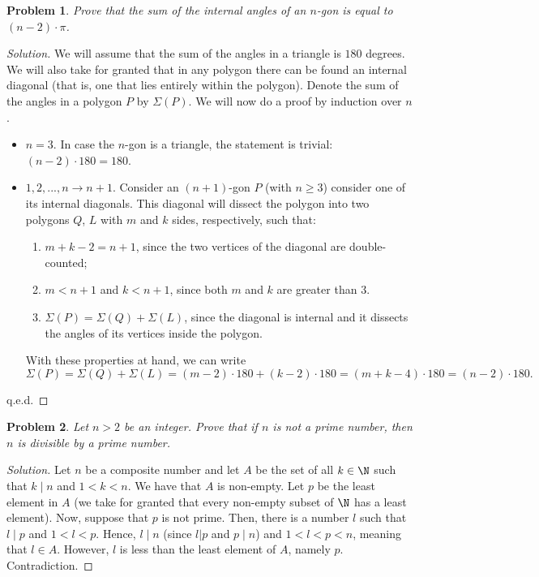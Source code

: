 \documentclass[a4paper, 12pt]{article}
\theoremstyle{plain}
\newtheorem{problem}{Problem}
\begin{document}
\begin{problem}
    Prove that the sum of the internal angles of an $n$-gon is equal to $(n-2) \cdot \pi$.
\end{problem}
\begin{proof}[Solution]
    We will assume that the sum of the angles in a triangle is $180$ degrees. We will also take for granted that in any polygon there can be found an internal diagonal (that is, one that lies entirely within the polygon). Denote the sum of the angles in a polygon $P$ by $\Sigma (P)$. We will now do a proof by induction over $n$.
    \begin{itemize}
        \item $n = 3$. In case the $n$-gon is a triangle, the statement is trivial: $(n-2) \cdot 180 = 180$.
        \item $1,2,...,n \to n+1$. Consider an $(n+1)$-gon $P$ (with $n \geqslant 3$) consider one of its internal diagonals. This diagonal will dissect the polygon into two polygons $Q$, $L$ with $m$ and $k$ sides, respectively, such that:
        \begin{enumerate}
            \item $m + k - 2 = n+1$, since the two vertices of the diagonal are double-counted;
            \item $m < n+1$ and $k < n+1$, since both $m$ and $k$ are greater than $3$.
            \item $\Sigma (P) = \Sigma (Q) + \Sigma (L)$, since the diagonal is internal and it dissects the angles of its vertices inside the polygon.
        \end{enumerate}
        With these properties at hand, we can write
            \[ \Sigma (P) = \Sigma (Q) + \Sigma (L) = (m - 2) \cdot 180 + (k - 2) \cdot 180 = (m + k - 4) \cdot 180 = (n - 2) \cdot 180. \]
    \end{itemize}
    q.e.d.
\end{proof}

\begin{problem}
    Let $n > 2$ be an integer. Prove that if $n$ is not a prime number, then $n$ is divisible by a prime number.
\end{problem}
\begin{proof}[Solution]
    Let $n$ be a composite number and let $A$ be the set of all $k \in \N$ such that $k \mid n$ and $1 < k < n$. We have that $A$ is non-empty. Let $p$ be the least element in $A$ (we take for granted that every non-empty subset of $\N$ has a least element). Now, suppose that $p$ is not prime. Then, there is a number $l$ such that $l \mid p$ and $1 < l < p$. Hence, $l \mid n$ (since $l | p$ and $p \mid n$) and $1 < l < p < n$, meaning that $l \in A$. However, $l$ is less than the least element of $A$, namely $p$. Contradiction.
\end{proof}
\end{document}
